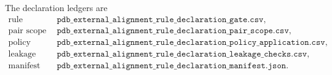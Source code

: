 The declaration ledgers are
\[
\begin{array}{ll}
\text{rule declaration} & \texttt{pdb\_external\_alignment\_rule\_declaration\_gate.csv},\\
\text{pair scope} & \texttt{pdb\_external\_alignment\_rule\_declaration\_pair\_scope.csv},\\
\text{policy} & \texttt{pdb\_external\_alignment\_rule\_declaration\_policy\_application.csv},\\
\text{leakage audit} & \texttt{pdb\_external\_alignment\_rule\_declaration\_leakage\_checks.csv},\\
\text{manifest} & \texttt{pdb\_external\_alignment\_rule\_declaration\_manifest.json}.
\end{array}
\]
